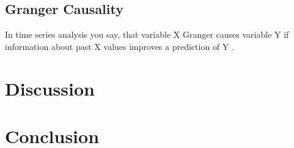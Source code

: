 \documentclass[a4paper]{report}
\begin{document}
	
	\section{Granger Causality}
	In time series analysis you say, that variable X Granger causes variable Y if information about past X values improves a prediction of Y \cite{Granger.1969}. 
	
	\chapter{Discussion}
	
	\chapter{Conclusion}
	
	
	\printbibliography
\end{document}
